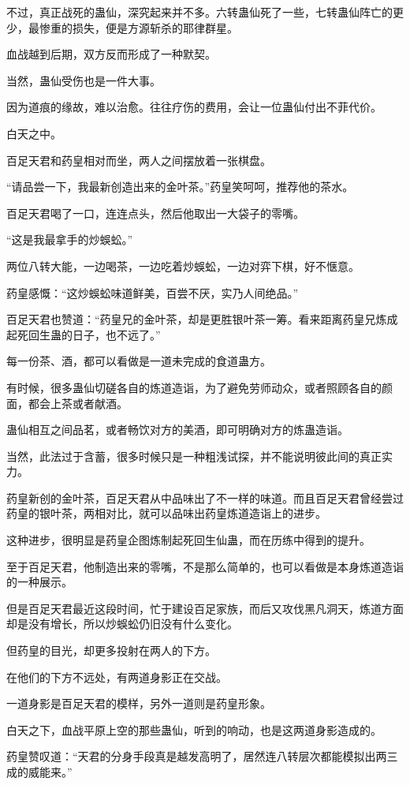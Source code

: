 \begin{this_body}
不过，真正战死的蛊仙，深究起来并不多。六转蛊仙死了一些，七转蛊仙阵亡的更少，最惨重的损失，便是方源斩杀的耶律群星。

血战越到后期，双方反而形成了一种默契。

当然，蛊仙受伤也是一件大事。

因为道痕的缘故，难以治愈。往往疗伤的费用，会让一位蛊仙付出不菲代价。

白天之中。

百足天君和药皇相对而坐，两人之间摆放着一张棋盘。

“请品尝一下，我最新创造出来的金叶茶。”药皇笑呵呵，推荐他的茶水。

百足天君喝了一口，连连点头，然后他取出一大袋子的零嘴。

“这是我最拿手的炒蜈蚣。”

两位八转大能，一边喝茶，一边吃着炒蜈蚣，一边对弈下棋，好不惬意。

药皇感慨：“这炒蜈蚣味道鲜美，百尝不厌，实乃人间绝品。”

百足天君也赞道：“药皇兄的金叶茶，却是更胜银叶茶一筹。看来距离药皇兄炼成起死回生蛊的日子，也不远了。”

每一份茶、酒，都可以看做是一道未完成的食道蛊方。

有时候，很多蛊仙切磋各自的炼道造诣，为了避免劳师动众，或者照顾各自的颜面，都会上茶或者献酒。

蛊仙相互之间品茗，或者畅饮对方的美酒，即可明确对方的炼蛊造诣。

当然，此法过于含蓄，很多时候只是一种粗浅试探，并不能说明彼此间的真正实力。

药皇新创的金叶茶，百足天君从中品味出了不一样的味道。而且百足天君曾经尝过药皇的银叶茶，两相对比，就可以品味出药皇炼道造诣上的进步。

这种进步，很明显是药皇企图炼制起死回生仙蛊，而在历练中得到的提升。

至于百足天君，他制造出来的零嘴，不是那么简单的，也可以看做是本身炼道造诣的一种展示。

但是百足天君最近这段时间，忙于建设百足家族，而后又攻伐黑凡洞天，炼道方面却是没有增长，所以炒蜈蚣仍旧没有什么变化。

但药皇的目光，却更多投射在两人的下方。

在他们的下方不远处，有两道身影正在交战。

一道身影是百足天君的模样，另外一道则是药皇形象。

白天之下，血战平原上空的那些蛊仙，听到的响动，也是这两道身影造成的。

药皇赞叹道：“天君的分身手段真是越发高明了，居然连八转层次都能模拟出两三成的威能来。”


\end{this_body}

